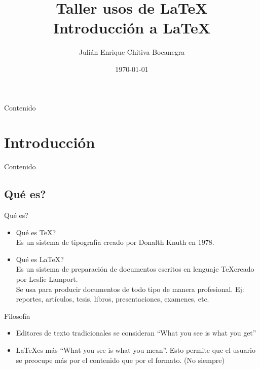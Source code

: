 \documentclass[dvipsnames,xcolor, handout]{beamer}
\title{Taller usos de \LaTeX \\ \small{Introducción a \LaTeX}  \vspace*{-0.2cm}}
\author[Julián Chitiva Bocanegra]{Julián Enrique Chitiva Bocanegra}
\institute[Uniandes] 
{Universidad de los Andes\\ Facultad de Economía}
\date{\today}
\theoremstyle{plain}
\theoremstyle{definition}
\begin{document}
\begin{frame}
  \titlepage
\end{frame}

\begin{frame}{Contenido}
  \tableofcontents%
\end{frame}


\section{Introducción}
\begin{frame}{Contenido}
  \tableofcontents[currentsection]%
\end{frame}
\subsection{\textquestiondown Qué es?}
\begin{frame}{\textquestiondown Qué es?}
\begin{itemize}
    \item \textquestiondown Qué es \TeX ?\pause\\
    Es un sistema de tipografía creado por Donalth Knuth en 1978. \pause
    \item \textquestiondown Qué es \LaTeX ?\pause\\
    Es un sistema de preparación de documentos escritos en lenguaje \TeX creado por Leslie Lamport.\\
    Se usa para producir documentos de todo tipo de manera profesional. Ej: reportes, artículos, tesis, libros, presentaciones, examenes, etc.
\end{itemize}
\end{frame}

\begin{frame}{Filosofía}
    \begin{itemize}
        \item Editores de texto tradicionales se consideran ``What you see is what you get''
        
        \item \LaTeX es más ``What you see is what you mean''. Esto permite que el usuario se preocupe más por el contenido que por el formato. (No siempre)
    \end{itemize}
\end{frame}
\end{document}
